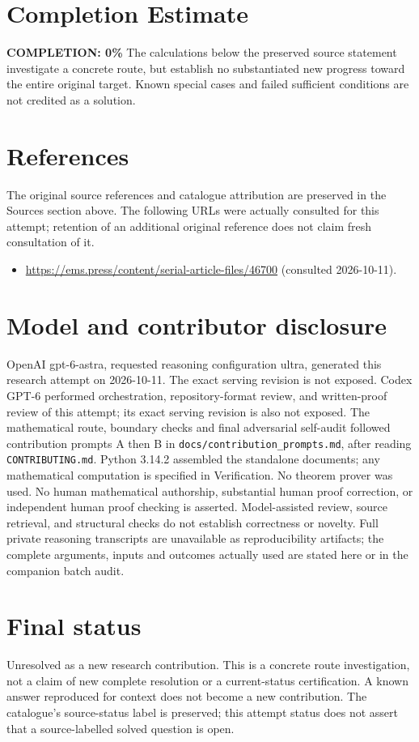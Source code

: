 \documentclass[11pt]{article}
\begin{document}
\section{Completion Estimate}
\noindent\textbf{COMPLETION: 0\%}
The calculations below the preserved source statement investigate a concrete route,
but establish no substantiated new progress toward the entire original target.
Known special cases and failed sufficient conditions are not credited as a solution.
\section{References}
The original source references and catalogue attribution are preserved in the
Sources section above. The following URLs were actually consulted for this attempt;
retention of an additional original reference does not claim fresh consultation of it.
\begin{itemize}
\item \url{https://ems.press/content/serial-article-files/46700} (consulted 2026-10-11). 
\end{itemize}
\section{Model and contributor disclosure}
OpenAI gpt-6-astra, requested reasoning configuration ultra, generated this research
attempt on 2026-10-11. The exact serving revision is not exposed. Codex GPT-6
performed orchestration, repository-format review, and written-proof review of this attempt; its exact serving revision
is also not exposed. The mathematical route, boundary checks and final adversarial
self-audit followed contribution prompts A then B in
\texttt{docs/contribution\_prompts.md}, after reading \texttt{CONTRIBUTING.md}.
Python 3.14.2 assembled the standalone documents; any mathematical computation is
specified in Verification. No theorem prover was used. No human mathematical
authorship, substantial human proof correction, or independent human proof checking
is asserted. Model-assisted review, source retrieval, and structural checks do not
establish correctness or novelty. Full private reasoning transcripts are unavailable
as reproducibility artifacts; the complete arguments, inputs and outcomes actually
used are stated here or in the companion batch audit.
\section{Final status}
Unresolved as a new research contribution. This is a concrete route investigation,
not a claim of new complete resolution or a current-status certification. A known
answer reproduced for context does not become a new contribution. The catalogue's
source-status label is preserved; this attempt status does not assert that a
source-labelled solved question is open.
\end{document}
